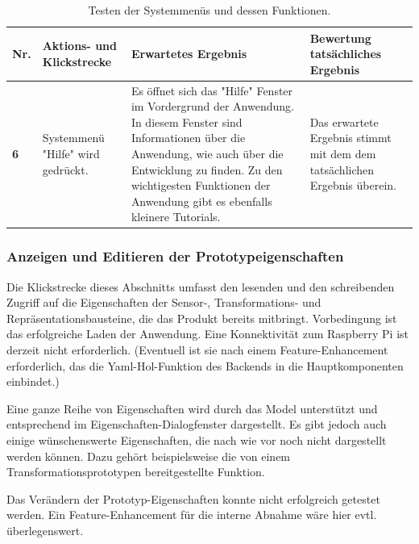 \documentclass[parskip=full]{scrartcl}
\begin{document}
	\begin{table}[h]
\begin{tabular}{| p{} | p{} | p{} | p{} |}
	\hline
	\textbf{Nr.} & \textbf{Aktions- und Klickstrecke} & \textbf{Erwartetes Ergebnis}  & \textbf{ Bewertung tatsächliches Ergebnis} \\ \hline

	\textbf{6}
	& 
	Systemmenü "Hilfe" wird gedrückt.
	&
	Es öffnet sich das "Hilfe" Fenster im Vordergrund der Anwendung. In diesem Fenster sind Informationen über die 				Anwendung, wie auch über die Entwicklung zu finden. Zu den wichtigesten Funktionen der Anwendung gibt es ebenfalls 			kleinere Tutorials.
	& 
	Das erwartete Ergebnis stimmt mit dem dem tatsächlichen Ergebnis überein.
	\\ \hline

	
\end{tabular}
\caption{Testen der Systemmenüs und dessen Funktionen.}
\label{klickMenu}
\end{table} 

\subsubsection{Anzeigen und Editieren der Prototypeigenschaften}

Die Klickstrecke dieses Abschnitts umfasst den lesenden und den schreibenden Zugriff auf die Eigenschaften der Sensor-, Transformations- und Repräsentationsbausteine, die das Produkt bereits mitbringt. Vorbedingung ist das erfolgreiche Laden der Anwendung. Eine Konnektivität zum Raspberry Pi ist derzeit nicht erforderlich. (Eventuell ist sie nach einem Feature-Enhancement erforderlich, das die Yaml-Hol-Funktion des Backends in die Hauptkomponenten einbindet.)

Eine ganze Reihe von Eigenschaften wird durch das Model unterstützt und entsprechend im Eigenschaften-Dialogfenster dargestellt. Es gibt jedoch auch einige wünschenswerte Eigenschaften, die nach wie vor noch nicht dargestellt werden können. Dazu gehört beispielsweise die von einem Transformationsprototypen bereitgestellte Funktion. 

Das Verändern der Prototyp-Eigenschaften konnte nicht erfolgreich getestet werden. Ein Feature-Enhancement für die interne Abnahme wäre hier evtl. überlegenswert. 
\end{document}
